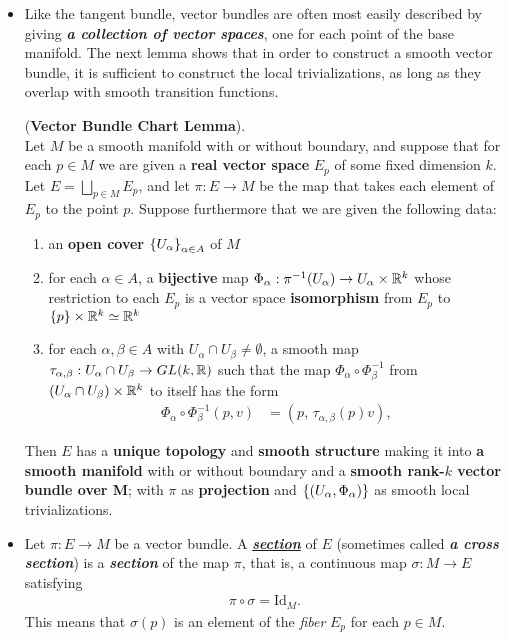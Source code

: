 \documentclass[11pt]{article}
\begin{document}
\begin{itemize}
\item Like the tangent bundle, vector bundles are often most easily described by giving \emph{\textbf{a collection of vector spaces}}, one for each point of the base manifold. The next lemma shows that in order to construct a smooth vector bundle, it is sufficient to construct the local trivializations, as long as they overlap with smooth transition
functions. 
\begin{lemma} (\textbf{Vector Bundle Chart Lemma}). \citep{lee2003introduction} \\
Let $M$ be a smooth manifold with or without boundary, and suppose that for each $p \in M$ we are given a \textbf{real vector space} $E_p$ of some fixed dimension $k$. Let $E = \bigsqcup_{p\in M} E_p$, and let $\pi: E \rightarrow M$ be the map that takes each element of $E_p$ to the point $p$. Suppose furthermore that we are
given the following data:
\begin{enumerate}
\item an \textbf{open cover} $\left\{U_{\alpha}\right\}_{\alpha \in A}$ of $M$
\item for each $\alpha \in A$, a \textbf{bijective} map $\Phi_{\alpha}: \pi^{-1}(U_{\alpha}) \rightarrow U_{\alpha} \times {\mathbb R}^k$ whose restriction to each $E_p$ is a vector space \textbf{isomorphism} from $E_p$ to $\left\{p\right\} \times {\mathbb R}^k \simeq {\mathbb R}^k$
\item for each $\alpha, \beta \in A$  with $U_{\alpha} \cap U_{\beta} \neq \emptyset$, a smooth map $\tau_{\alpha, \beta}: U_{\alpha} \cap U_{\beta} \rightarrow  GL(k, {\mathbb R})$ such that the map $\Phi_{\alpha} \circ \Phi_{\beta}^{-1}$ from $(U_{\alpha} \cap U_{\beta}) \times {\mathbb R}^k$ to itself has the form
\begin{align}
\Phi_{\alpha} \circ \Phi_{\beta}^{-1}(p,v)  &=  (p,  \, \tau_{\alpha, \beta}(p)v),  \label{eqn: change_of_coordinate_vector_bundle}
\end{align}
\end{enumerate}
Then $E$ has a \textbf{unique topology} and \textbf{smooth structure} making it into \textbf{a smooth manifold} with or without boundary and a \textbf{smooth rank-$k$ vector bundle over M}; with $\pi$ as \textbf{projection} and $\left\{(U_{\alpha}, \Phi_{\alpha})\right\}$ as smooth local trivializations.
\end{lemma}

\item \begin{definition}
Let $\pi: E \rightarrow M$ be a vector bundle. A \underline{\emph{\textbf{section}}} of $E$ (sometimes called \emph{\textbf{a cross section}}) is a \emph{\textbf{section}} of the map $\pi$, that is, a continuous map  $\sigma: M \rightarrow E$ satisfying
\begin{align*}
\pi \circ \sigma =  \text{Id}_M. 
\end{align*} This means that $\sigma(p)$ is an element of the \emph{fiber} $E_p$ for each $p \in M$.
\end{definition}


\end{itemize}
\end{document}
